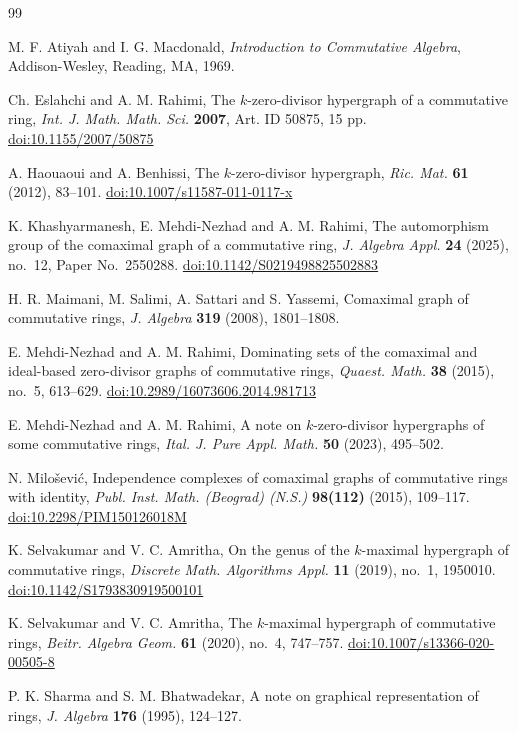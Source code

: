 \documentclass{amsart}
\theoremstyle{definition}
\theoremstyle{remark}
\newcommand{\doi}[1]{\href{https://doi.org/#1}{doi:#1}}
\begin{document}
\begin{thebibliography}{99}

 M. F. Atiyah and I. G. Macdonald, \emph{Introduction to Commutative Algebra}, Addison-Wesley, Reading, MA, 1969.

 Ch. Eslahchi and A. M. Rahimi, The $k$-zero-divisor hypergraph of a commutative ring, \emph{Int. J. Math. Math. Sci.} \textbf{2007}, Art. ID 50875, 15 pp. \doi{10.1155/2007/50875}

 A. Haouaoui and A. Benhissi, The $k$-zero-divisor hypergraph, \emph{Ric. Mat.} \textbf{61} (2012), 83--101. \doi{10.1007/s11587-011-0117-x}

 K. Khashyarmanesh, E. Mehdi-Nezhad and A. M. Rahimi, The automorphism group of the comaximal graph of a commutative ring, \emph{J. Algebra Appl.} \textbf{24} (2025), no.~12, Paper No.~2550288. \doi{10.1142/S0219498825502883}

 H. R. Maimani, M. Salimi, A. Sattari and S. Yassemi, Comaximal graph of commutative rings, \emph{J. Algebra} \textbf{319} (2008), 1801--1808.

 E. Mehdi-Nezhad and A. M. Rahimi, Dominating sets of the comaximal and ideal-based zero-divisor graphs of commutative rings, \emph{Quaest. Math.} \textbf{38} (2015), no.~5, 613--629. \doi{10.2989/16073606.2014.981713}

 E. Mehdi-Nezhad and A. M. Rahimi, A note on $k$-zero-divisor hypergraphs of some commutative rings, \emph{Ital. J. Pure Appl. Math.} \textbf{50} (2023), 495--502.

 N. Milo\v{s}evi\'c, Independence complexes of comaximal graphs of commutative rings with identity, \emph{Publ. Inst. Math. (Beograd) (N.S.)} \textbf{98(112)} (2015), 109--117. \doi{10.2298/PIM150126018M}

 K. Selvakumar and V. C. Amritha, On the genus of the $k$-maximal hypergraph of commutative rings, \emph{Discrete Math. Algorithms Appl.} \textbf{11} (2019), no.~1, 1950010. \doi{10.1142/S1793830919500101}

 K. Selvakumar and V. C. Amritha, The $k$-maximal hypergraph of commutative rings, \emph{Beitr. Algebra Geom.} \textbf{61} (2020), no.~4, 747--757. \doi{10.1007/s13366-020-00505-8}

 P. K. Sharma and S. M. Bhatwadekar, A note on graphical representation of rings, \emph{J. Algebra} \textbf{176} (1995), 124--127.

\end{thebibliography}
\end{document}
